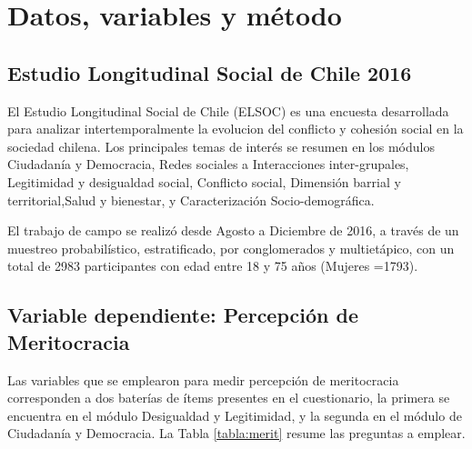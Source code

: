 \documentclass[12pt]{article}
\begin{document}
\newpage
	
\section{Datos, variables y método}

\subsection[Estudio Longitudinal Social de Chile]{Estudio Longitudinal Social de Chile 2016}
	
El Estudio Longitudinal Social de Chile (ELSOC) es una encuesta desarrollada para analizar intertemporalmente la evolucion del conflicto y cohesión social en la sociedad chilena. Los principales temas de interés se resumen en los módulos Ciudadanía y Democracia, Redes sociales a Interacciones inter-grupales, Legitimidad y desigualdad social, Conflicto social, Dimensión barrial y territorial,Salud y bienestar, y Caracterización Socio-demográfica. 

El trabajo de campo se realizó desde Agosto a Diciembre de 2016, a través de un muestreo probabilístico, estratificado, por conglomerados y multietápico, con un total de 2983 participantes con edad entre 18 y 75 años (Mujeres =1793).
 	
\subsection{Variable dependiente: Percepción de Meritocracia}

Las variables que se emplearon para medir percepción de meritocracia corresponden a dos baterías de ítems presentes en el cuestionario, la primera se encuentra en el módulo Desigualdad y Legitimidad, y la segunda en el módulo de Ciudadanía y Democracia. La Tabla \ref{tabla:merit} resume las preguntas a emplear. 
	
\end{document}
